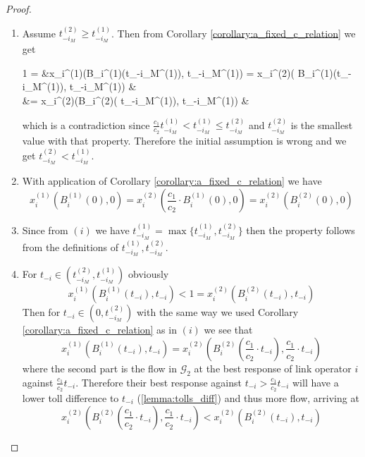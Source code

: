 \documentclass[10pt,a4paper]{book}
\newcommand{\Gm}{\mathcal{G}}
\theoremstyle{definition}
\theoremstyle{comment}
\begin{document}
\begin{proof}
	$ $
	\begin{enumerate}[$(i)$]
		\item Assume $t_{-i_M}^{(2)} \ge t_{-i_M}^{(1)}$.
		Then from Corollary \ref{corollary:a_fixed_c_relation} we get
		\begin{flalign*}
			1 = &x_i^{(1)}(B_i^{(1)}(t_{-i_M}^{(1)}), t_{-i_M}^{(1)}) = x_i^{(2)}\left(  \cdot B_i^{(1)}(t_{-i_M}^{(1)}),  \cdot t_{-i_M}^{(1)}\right) & \\
			&= x_i^{(2)}\left(B_i^{(2)}\left( \cdot t_{-i_M}^{(1)}\right),  \cdot t_{-i_M}^{(1)}\right) &
		\end{flalign*}
		which is a contradiction since $\frac{c_1}{c_2} t_{-i_M}^{(1)} < t_{-i_M}^{(1)} \le t_{-i_M}^{(2)}$ and $t_{-i_M}^{(2)}$ is the smallest value with that property.
		Therefore the initial assumption is wrong and we get $t_{-i_M}^{(2)} < t_{-i_M}^{(1)}$.
		\item With application of Corollary \ref{corollary:a_fixed_c_relation} we have
		\[
			x_i^{(1)}(B_i^{(1)}(0), 0) = x_i^{(2)}\left(\frac{c_1}{c_2} \cdot B_i^{(1)}(0), 0\right) = x_i^{(2)}(B_i^{(2)}(0), 0)
		\]
		\item Since from $(i)$ we have $t_{-i_M}^{(1)} = \max\{t_{-i_M}^{(1)}, t_{-i_M}^{(2)}\}$ then the property follows from the definitions of $t_{-i_M}^{(1)}, t_{-i_M}^{(2)}$.
		\item For $t_{-i} \in (t_{-i_M}^{(2)}, t_{-i_M}^{(1)})$ obviously
		\[
			x_i^{(1)}(B_i^{(1)}(t_{-i}), t_{-i}) < 1 = x_i^{(2)}(B_i^{(2)}(t_{-i}), t_{-i})
		\]
		Then for $t_{-i} \in (0, t_{-i_M}^{(2)})$ with the same way we used Corollary \ref{corollary:a_fixed_c_relation} as in $(i)$ we see that
		\[
			x_i^{(1)}(B_i^{(1)}(t_{-i}), t_{-i}) = x_i^{(2)}\left(B_i^{(2)}\left(\frac{c_1}{c_2} \cdot t_{-i}\right), \frac{c_1}{c_2} \cdot t_{-i}\right)
		\]
		where the second part is the flow in $\Gm_2$ at the best response of link operator $i$ against $\frac{c_1}{c_2} t_{-i}$.
		Therefore their best response against $t_{-i} > \frac{c_1}{c_2} t_{-i}$ will have a lower toll difference to $t_{-i}$ (\ref{lemma:tolls_diff}) and thus more flow, arriving at
		\[
			x_i^{(2)}\left(B_i^{(2)}\left(\frac{c_1}{c_2} \cdot t_{-i}\right), \frac{c_1}{c_2} \cdot t_{-i}\right) < x_i^{(2)}(B_i^{(2)}(t_{-i}), t_{-i})
		\]
	\end{enumerate}
\end{proof}
\end{document}
